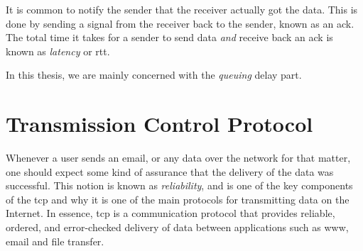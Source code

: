 It is common to notify the sender that the receiver actually got the data. This is done by sending a signal from the receiver back to the sender, known as an \gls{ack}. The total time it takes for a sender to send data \textit{and} receive back an \gls{ack} is known as \textit{latency} or \gls{rtt}.

In this thesis, we are mainly concerned with the \textit{queuing} delay part.












\section{Transmission Control Protocol}

Whenever a user sends an email, or any data over the network for that matter, one should expect some kind of assurance that the delivery of the data was successful. This notion is known as \textit{reliability}, and is one of the key components of the \gls{tcp} and why it is one of the main protocols for transmitting data on the Internet. In essence, \gls{tcp} is a communication protocol that provides reliable, ordered, and error-checked delivery of data between applications such as \gls{www}, email and file transfer.


